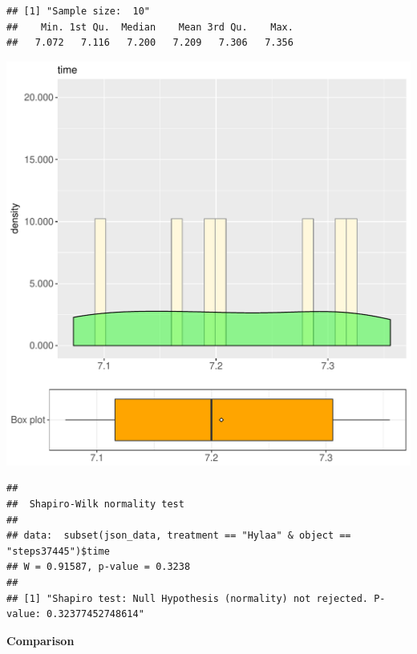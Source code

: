 \documentclass{article}\usepackage[]{graphicx}\usepackage[]{color}
\makeatletter
\def\maxwidth{ %
  \ifdim\Gin@nat@width>\linewidth
    \linewidth
  \else
    \Gin@nat@width
  \fi
}
\newenvironment{kframe}{%
 \def\at@end@of@kframe{}%
 \ifinner\ifhmode%
  \def\at@end@of@kframe{\end{minipage}}%
  \begin{minipage}{\columnwidth}%
 \fi\fi%
 \def\FrameCommand##1{\hskip\@totalleftmargin \hskip-\fboxsep
 \colorbox{shadecolor}{##1}\hskip-\fboxsep
     \hskip-\linewidth \hskip-\@totalleftmargin \hskip\columnwidth}%
 \MakeFramed {\advance\hsize-\width
   \@totalleftmargin\z@ \linewidth\hsize
   \@setminipage}}%
 {\par\unskip\endMakeFramed%
 \at@end@of@kframe}
\newenvironment{knitrout}{}{} %
\makeatother
\begin{document}
\begin{knitrout}
\color{fgcolor}\begin{kframe}
\begin{verbatim}
## [1] "Sample size:  10"
##    Min. 1st Qu.  Median    Mean 3rd Qu.    Max. 
##   7.072   7.116   7.200   7.209   7.306   7.356
\end{verbatim}
\end{kframe}
\includegraphics[width=\maxwidth]{figure/RH2_Hylaa_steps37445-1} 
\begin{kframe}\begin{verbatim}
## 
## 	Shapiro-Wilk normality test
## 
## data:  subset(json_data, treatment == "Hylaa" & object == "steps37445")$time
## W = 0.91587, p-value = 0.3238
## 
## [1] "Shapiro test: Null Hypothesis (normality) not rejected. P-value: 0.32377452748614"
\end{verbatim}
\end{kframe}
\end{knitrout}
  
 \textbf{Comparison}
  
\end{document}
